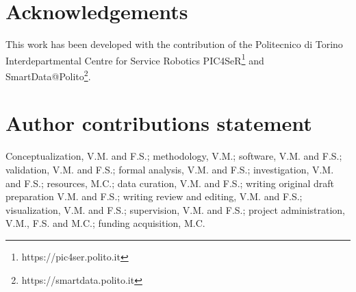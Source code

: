 \documentclass{article}
\begin{document}
\section*{Acknowledgements}
This work has been developed with the contribution of the Politecnico di Torino Interdepartmental Centre for Service Robotics PIC4SeR\footnote{https://pic4ser.polito.it} and SmartData@Polito\footnote{https://smartdata.polito.it}.

\section*{Author contributions statement}
Conceptualization, V.M. and F.S.; methodology, V.M.; software, V.M. and F.S.; validation, V.M. and F.S.; formal analysis, V.M. and F.S.; investigation, V.M. and F.S.; resources, M.C.; data curation, V.M. and F.S.; writing original draft preparation V.M. and F.S.; writing review and editing, V.M. and F.S.; visualization, V.M. and F.S.; supervision, V.M. and F.S.; project administration, V.M., F.S. and M.C.; funding acquisition, M.C. 


  
  
\end{document}
